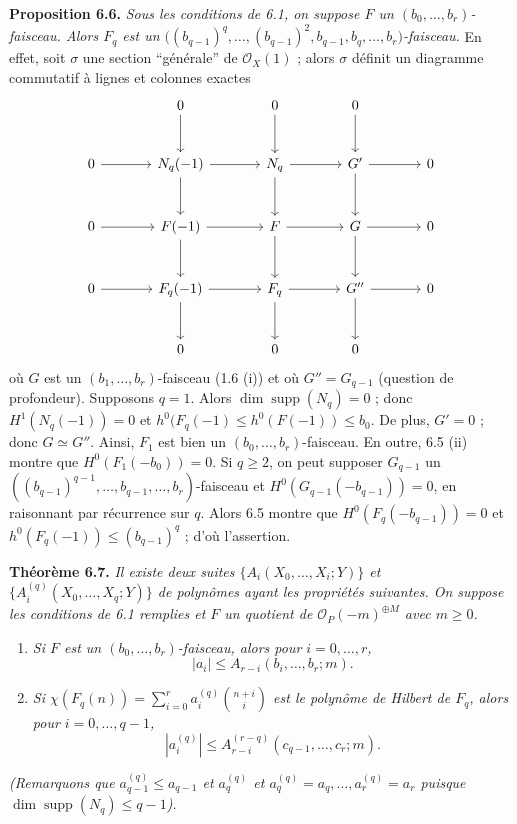 \textbf{Proposition 6.6.} \emph{Sous les conditions de 6.1, on suppose $F$ un $(b_0,\ldots,b_r)$-faisceau. Alors $F_q$ est un $\bigl((b_{q-1})^q,\ldots,(b_{q-1})^2,b_{q-1},b_q,\ldots,b_r\bigr)$-faisceau.}
En effet, soit $\sigma$ une section ``g\'en\'erale'' de $\mathcal O_X(1)$ ; alors $\sigma$ d\'efinit un diagramme commutatif \`a lignes et colonnes exactes
\[
\begin{tikzcd}[column sep=large,row sep=large]
&0 \arrow[d]&0 \arrow[d]&0 \arrow[d]&\\
0 \arrow[r]&N_q(-1) \arrow[r] \arrow[d]&N_q \arrow[r] \arrow[d]&G' \arrow[r] \arrow[d]&0\\
0 \arrow[r]&F(-1) \arrow[r] \arrow[d]&F \arrow[r] \arrow[d]&G \arrow[r] \arrow[d]&0\\
0 \arrow[r]&F_q(-1) \arrow[r] \arrow[d]&F_q \arrow[r] \arrow[d]&G'' \arrow[r] \arrow[d]&0\\
&0&0&0&
\end{tikzcd}
\]
o\`u $G$ est un $(b_1,\ldots,b_r)$-faisceau (1.6 (i)) et o\`u $G''=G_{q-1}$ (question de profondeur).
Supposons $q=1$. Alors $\dim\operatorname{supp}(N_q)=0$ ; donc $H^1(N_q(-1))=0$ et $h^0(F_q(-1)\le h^0(F(-1))\le b_0$. De plus, $G'=0$ ; donc $G\simeq G''$. Ainsi, $F_1$ est bien un $(b_0,\ldots,b_r)$-faisceau. En outre, 6.5 (ii) montre que $H^0(F_1(-b_0))=0$. Si $q\ge2$, on peut supposer $G_{q-1}$ un $((b_{q-1})^{q-1},\ldots,b_{q-1},\ldots,b_r)$-faisceau et $H^0(G_{q-1}(-b_{q-1}))=0$, en raisonnant par r\'ecurrence sur $q$. Alors 6.5 montre que $H^0(F_q(-b_{q-1}))=0$ et $h^0(F_q(-1))\le (b_{q-1})^q$ ; d'o\`u l'assertion.

\textbf{Th\'eor\`eme 6.7.} \emph{Il existe deux suites $\{A_i(X_0,\ldots,X_i;Y)\}$ et $\{A_i^{(q)}(X_0,\ldots,X_q;Y)\}$ de polyn\^omes ayant les propri\'et\'es suivantes. On suppose les conditions de 6.1 remplies et $F$ un quotient de $\mathcal O_P(-m)^{\oplus M}$ avec $m\ge0$.}
\begin{enumerate}[label=(\roman*)]
\item \emph{Si $F$ est un $(b_0,\ldots,b_r)$-faisceau, alors pour $i=0,\ldots,r$,}
\[
   |a_i|\le A_{r-i}(b_i,\ldots,b_r;m).
\]
\item \emph{Si $\chi(F_q(n))=\sum_{i=0}^{r} a_i^{(q)}\binom{n+i}{i}$ est le polyn\^ome de Hilbert de $F_q$, alors pour $i=0,\ldots,q-1$,}
\[
   |a_i^{(q)}|\le A_{r-i}^{(r-q)}(c_{q-1},\ldots,c_r;m).
\]
\end{enumerate}
\emph{(Remarquons que $a_{q-1}^{(q)}\le a_{q-1}$ et $a_q^{(q)}$ et $a_q^{(q)}=a_q,\ldots,a_r^{(q)}=a_r$ puisque $\dim\operatorname{supp}(N_q)\le q-1$).}


